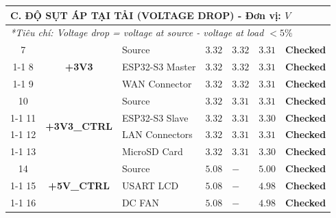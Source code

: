 \begin{longtable}{|c|c|p{4cm}|>{\centering\arraybackslash}p{1.5cm}|>{\centering\arraybackslash}p{1.5cm}|>{\centering\arraybackslash}p{1.5cm}|c|}
            \multicolumn{7}{|l|}{\textbf{C. ĐỘ SỤT ÁP TẠI TẢI (VOLTAGE DROP) - Đơn vị: $V$}} \\ \hline
            \multicolumn{7}{|l|}{\textit{*Tiêu chí: Voltage drop = voltage at source - voltage at load $< 5\%$}} \\ \hline

            7 & \multirow{3}{*}{\textbf{+3V3}} & Source          & $3.32$ & $3.32$ & $3.31$ & \textcolor{modern_green}{\textbf{Checked}} \\ \cline{1-1} \cline{3-7}
            8 &                                & ESP32-S3 Master & $3.32$ & $3.32$ & $3.31$ & \textcolor{modern_green}{\textbf{Checked}} \\ \cline{1-1} \cline{3-7}
            9 &                                & WAN Connector   & $3.32$ & $3.32$ & $3.31$ & \textcolor{modern_green}{\textbf{Checked}} \\ %

            \pagebreak

            10 & \multirow{4}{*}{\textbf{+3V3\_CTRL}} & Source         & $3.32$ & $3.31$ & $3.31$ & \textcolor{modern_green}{\textbf{Checked}} \\ \cline{1-1} \cline{3-7}
            11 &                                     & ESP32-S3 Slave & $3.32$ & $3.31$ & $3.30$ & \textcolor{modern_green}{\textbf{Checked}} \\ \cline{1-1} \cline{3-7}
            12 &                                     & LAN Connectors & $3.32$ & $3.31$ & $3.31$ & \textcolor{modern_green}{\textbf{Checked}} \\ \cline{1-1} \cline{3-7}
            13 &                                     & MicroSD Card   & $3.32$ & $3.31$ & $3.30$ & \textcolor{modern_green}{\textbf{Checked}} \\ \hline

            14 & \multirow{3}{*}{\textbf{+5V\_CTRL}} & Source     & $5.08$ & $-$ & $5.00$ & \textcolor{modern_green}{\textbf{Checked}} \\ \cline{1-1} \cline{3-7}
            15 &                                    & USART LCD  & $5.08$ & $-$ & $4.98$ & \textcolor{modern_green}{\textbf{Checked}} \\ \cline{1-1} \cline{3-7}
            16 &                                    & DC FAN     & $5.08$ & $-$ & $4.98$ & \textcolor{modern_green}{\textbf{Checked}} \\ \hline

        \end{longtable}

